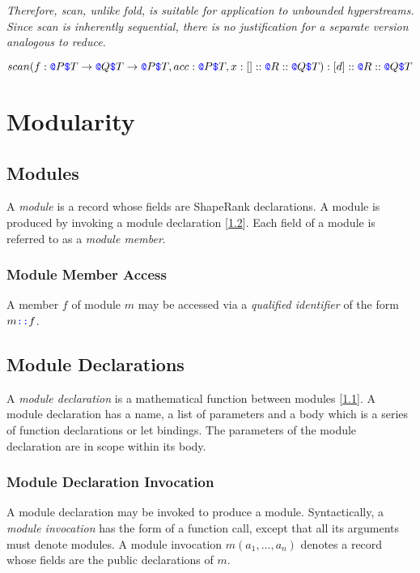 \documentclass{article}
\begin{document}
{\em 
Therefore, scan, unlike fold, is suitable for application to unbounded hyperstreams. Since scan is inherently sequential, there is no justification for a separate version analogous to reduce.
}

$scan(f: \texttt{\color{blue} @}{}P \texttt{\color{blue} \$}{}T \to{} \texttt{\color{blue} @}{}Q \texttt{\color{blue} \$}{}T \to{} \texttt{\color{blue} @}{}P \texttt{\color{blue} \$}{}T, acc: \texttt{\color{blue} @}{}P \texttt{\color{blue} \$}{}T, x:[]::\texttt{\color{blue} @}{}R::\texttt{\color{blue} @}{}Q \texttt{\color{blue} \$}{}T):[d]::\texttt{\color{blue} @}{}R::\texttt{\color{blue} @}{}Q \texttt{\color{blue} \$}{}T$

\section{Modularity}
\label{modularity}

\subsection{Modules}
\label{modules}

A {\em module} is a record whose fields are ShapeRank declarations. A module is produced by invoking a module declaration [\ref{moduleDeclarations}].
Each field of a module is referred to as a {\em module member}.

\subsubsection{Module Member Access}
\label{moduleMemberAccess}

A member  $f$ of module $m$ may be accessed via a {\em qualified identifier} of the form $m \texttt{\color{blue} ::}{} f$.




\subsection{Module Declarations}
\label{moduleDeclarations}

A {\em module declaration} is a mathematical function between modules [\ref{modules}].  A module declaration has a name, a list of parameters and a body which is a series of function declarations or let bindings.  The parameters  of the module declaration are in scope within its body.

\subsubsection{Module Declaration Invocation}
\label{moduleDeclarationInvocation}

A module declaration may be invoked to produce a module. Syntactically, a {\em module invocation} has the form of a function call, except that all its arguments must denote modules.
A module invocation $m(a_1, \ldots, a_n)$ denotes a record whose fields are the public declarations of $m$.
\end{document}
